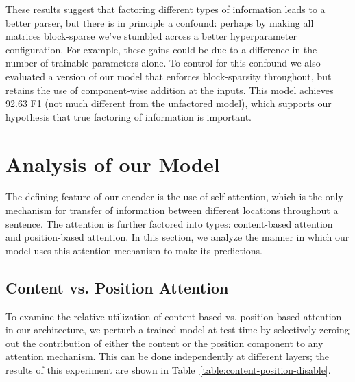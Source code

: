 \documentclass[11pt,a4paper]{article}
\begin{document}
These results suggest that factoring different types of information leads to a better parser, but there is in principle a confound: perhaps by making all matrices block-sparse we've stumbled across a better hyperparameter configuration. For example, these gains could be due to a difference in the number of trainable parameters alone. To control for this confound we also evaluated a version of our model that enforces block-sparsity throughout, but retains the use of component-wise addition at the inputs. This model achieves 92.63 F1 (not much different from the unfactored model), which supports our hypothesis that true factoring of information is important.

\section{Analysis of our Model}
\label{sec:analysis}

The defining feature of our encoder is the use of self-attention, which is the only mechanism for transfer of information between different locations throughout a sentence. The attention is further factored into types: content-based attention and position-based attention. In this section, we analyze the manner in which our model uses this attention mechanism to make its predictions.

\subsection{Content vs. Position Attention}

To examine the relative utilization of content-based vs. position-based attention in our architecture, we perturb a trained model at test-time by selectively zeroing out the contribution of either the content or the position component to any attention mechanism. This can be done independently at different layers; the results of this experiment are shown in Table~\ref{table:content-position-disable}.
\end{document}
